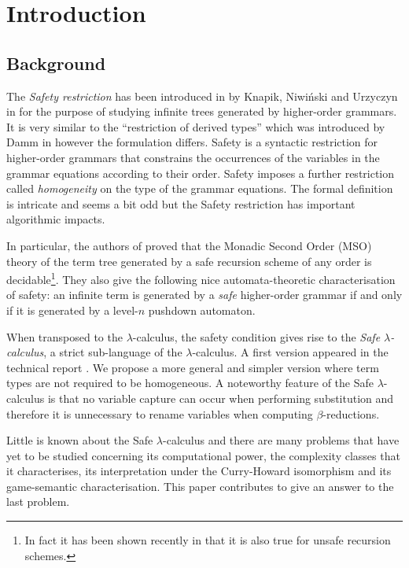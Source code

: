 \documentclass{llncs}
\begin{document}
\section{Introduction}

\subsection{Background}

The \emph{Safety restriction} has been introduced in by Knapik, Niwi{\'n}ski and Urzyczyn in \cite{KNU02}
for the purpose of studying infinite trees generated by higher-order grammars.
It is very similar to the ``restriction of derived types'' which was introduced
by Damm in \cite{Dam82} however the formulation differs.
Safety is a syntactic restriction for higher-order grammars that
constrains the occurrences of the variables in the grammar
equations according to their order. Safety imposes a further restriction called \emph{homogeneity} on the type of the grammar equations.
The formal definition is intricate and seems a bit odd but the Safety restriction has important algorithmic impacts.

In particular, the authors of \cite{KNU02} proved that the Monadic Second
Order (MSO) theory of the term tree generated by a safe recursion
scheme of any order is decidable\footnote{In fact it has been shown
recently in \cite{OngLics2006} that it is also true for unsafe
recursion schemes.}. They also give the following nice automata-theoretic characterisation of safety:
an infinite term is generated by a \emph{safe} higher-order grammar if and only if
it is generated by a level-$n$ pushdown automaton.


When transposed to the $\lambda$-calculus, the safety condition
gives rise to the \emph{Safe $\lambda$-calculus}, a strict
sub-language of the $\lambda$-calculus. A first version appeared in
the technical report \cite{safety-mirlong2004}. We propose a more
general and simpler version where term types are not required to be
homogeneous. A noteworthy feature of the Safe
$\lambda$-calculus is that no variable capture can occur when
performing substitution and therefore it is unnecessary to rename
variables when computing $\beta$-reductions.

Little is known about the Safe $\lambda$-calculus and there are many
problems that have yet to be studied concerning its
computational power, the complexity classes that it characterises,
its interpretation under the Curry-Howard isomorphism and its
game-semantic characterisation. This paper contributes to give an
answer to the last problem.
\end{document}

